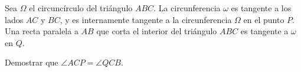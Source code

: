 Sea $\Omega$ el circuncírculo del triángulo $ABC$. La circunferencia $\omega$ es tangente a los lados $AC$ y $BC$, y es internamente tangente a la circunferencia $\Omega$ en el punto $P$. Una recta paralela a $AB$ que corta el interior del triángulo $ABC$ es tangente a $\omega$ en $Q$.

Demostrar que $\angle ACP = \angle QCB$.